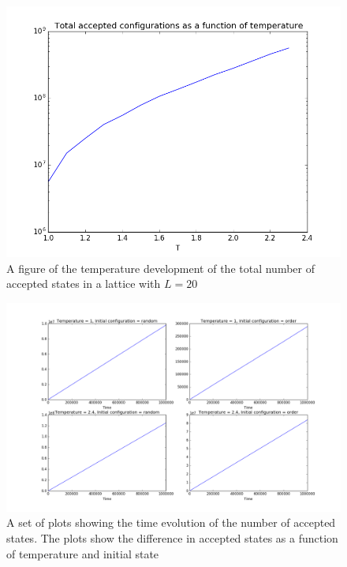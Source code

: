 \documentclass[12pt]{article}
\begin{document}
\begin{figure}[H]
\includegraphics[scale=0.6]{temp_total_config.png}
\caption{A figure of the temperature development of the total number of accepted states in a lattice with $L = 20$}\label{fig:temp_config}
\end{figure}


\begin{figure}[H]
\hspace*{-2cm}\includegraphics[scale=0.4]{accept_configs.png}
\caption{A set of plots showing the time evolution of the number of accepted states. The plots show the difference in accepted states as a function of temperature and initial state}\label{fig:accept_config}
\end{figure}
\end{document}
